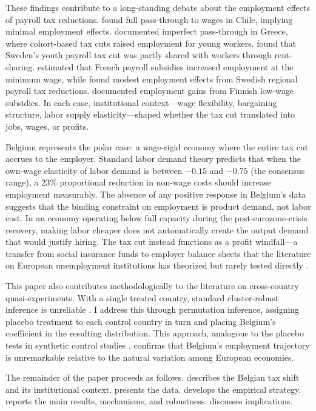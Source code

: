 \documentclass[12pt]{article}
\begin{document}
These findings contribute to a long-standing debate about the employment effects of payroll tax reductions. \citet{gruber1997} found full pass-through to wages in Chile, implying minimal employment effects. \citet{saezetal2012} documented imperfect pass-through in Greece, where cohort-based tax cuts raised employment for young workers. \citet{saezetal2019} found that Sweden's youth payroll tax cut was partly shared with workers through rent-sharing. \citet{kramarzphilippon2001} estimated that French payroll subsidies increased employment at the minimum wage, while \citet{bennmarkeretal2009} found modest employment effects from Swedish regional payroll tax reductions. \citet{huttunenetal2013} documented employment gains from Finnish low-wage subsidies. In each case, institutional context---wage flexibility, bargaining structure, labor supply elasticity---shaped whether the tax cut translated into jobs, wages, or profits.

Belgium represents the polar case: a wage-rigid economy where the entire tax cut accrues to the employer. Standard labor demand theory \citep{hamermesh1993, cahucetal2014} predicts that when the own-wage elasticity of labor demand is between $-0.15$ and $-0.75$ (the consensus range), a 23\% proportional reduction in non-wage costs should increase employment measurably. The absence of any positive response in Belgium's data suggests that the binding constraint on employment is product demand, not labor cost. In an economy operating below full capacity during the post-eurozone-crisis recovery, making labor cheaper does not automatically create the output demand that would justify hiring. The tax cut instead functions as a profit windfall---a transfer from social insurance funds to employer balance sheets that the literature on European unemployment institutions has theorized but rarely tested directly \citep{nickell1997, blanchard2006}.

This paper also contributes methodologically to the literature on cross-country quasi-experiments. With a single treated country, standard cluster-robust inference is unreliable \citep{conley2011}. I address this through permutation inference, assigning placebo treatment to each control country in turn and placing Belgium's coefficient in the resulting distribution. This approach, analogous to the placebo tests in synthetic control studies \citep{abadie2010}, confirms that Belgium's employment trajectory is unremarkable relative to the natural variation among European economies.

The remainder of the paper proceeds as follows.  describes the Belgian tax shift and its institutional context.  presents the data.  develops the empirical strategy.  reports the main results, mechanisms, and robustness.  discusses implications.
\end{document}

